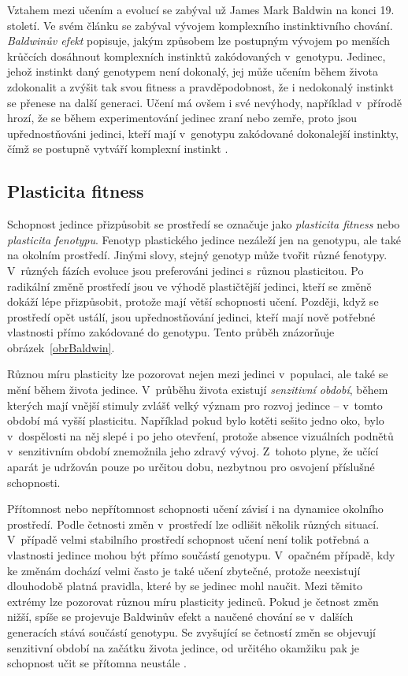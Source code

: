 Vztahem mezi učením a evolucí se zabýval už James Mark Baldwin na konci 19. století. Ve svém článku \cite{Baldwin} se zabýval vývojem komplexního instinktivního chování. \emph{Baldwinův efekt} popisuje, jakým způsobem lze postupným vývojem po menších krůčcích dosáhnout komplexních instinktů zakódovaných v~genotypu. Jedinec, jehož instinkt daný genotypem není dokonalý, jej může učením během života zdokonalit a zvýšit tak svou fitness a pravděpodobnost, že i nedokonalý instinkt se přenese na další generaci. Učení má ovšem i své nevýhody, například v~přírodě hrozí, že se během experimentování jedinec zraní nebo zemře, proto jsou upřednostňováni jedinci, kteří mají v~genotypu zakódované dokonalejší instinkty, čímž se postupně vytváří komplexní instinkt \cite{HowToShiftBias}.

\subsection{Plasticita fitness}
\label{secPlasticity}

Schopnost jedince přizpůsobit se prostředí se označuje jako \emph{plasticita fitness} nebo \emph{plasticita fenotypu}. Fenotyp plastického jedince nezáleží jen na genotypu, ale také na okolním prostředí. Jinými slovy, stejný genotyp může tvořit různé fenotypy. V~různých fázích evoluce jsou preferováni jedinci s~různou plasticitou. Po radikální změně prostředí jsou ve výhodě plastičtější jedinci, kteří se změně dokáží lépe přizpůsobit, protože mají větší schopnosti učení. Později, když se prostředí opět ustálí, jsou upřednostňování jedinci, kteří mají nově potřebné vlastnosti přímo zakódované do genotypu. Tento průběh znázorňuje obrázek~\ref{obrBaldwin}.

Různou míru plasticity lze pozorovat nejen mezi jedinci v~populaci, ale také se mění během života jedince. V~průběhu života existují \emph{senzitivní období}, během kterých mají vnější stimuly zvlášť velký význam pro rozvoj jedince -- v~tomto období má vyšší plasticitu. Například pokud bylo kotěti sešito jedno oko, bylo v~dospělosti na něj slepé i po jeho otevření, protože absence vizuálních podnětů v~senzitivním období znemožnila jeho zdravý vývoj. Z~tohoto plyne, že učící aparát je udržován pouze po určitou dobu, nezbytnou pro osvojení příslušné schopnosti.

Přítomnost nebo nepřítomnost schopnosti učení závisí i na dynamice okolního prostředí. Podle četnosti změn v~prostředí lze odlišit několik různých situací. V~případě velmi stabilního prostředí schopnost učení není tolik potřebná a vlastnosti jedince mohou být přímo součástí genotypu. V~opačném případě, kdy ke změnám dochází velmi často je také učení zbytečné, protože neexistují dlouhodobě platná pravidla, které by se jedinec mohl naučit. Mezi těmito extrémy lze pozorovat různou míru plasticity jedinců. Pokud je četnost změn nižší, spíše se projevuje Baldwinův efekt a naučené chování se v~dalších generacích stává součástí genotypu. Se zvyšující se četností změn se objevují senzitivní období na začátku života jedince, od určitého okamžiku pak je schopnost učit se přítomna neustále \cite{EllefsenBalancing}.

